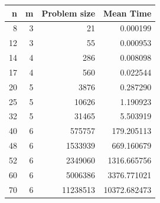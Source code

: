 \begin{tabular}{rrrr}
\toprule
n & m & Problem size & Mean Time \\
\midrule
8 & 3 & 21 & 0.000199 \\
12 & 3 & 55 & 0.000953 \\
14 & 4 & 286 & 0.008098 \\
17 & 4 & 560 & 0.022544 \\
20 & 5 & 3876 & 0.287290 \\
25 & 5 & 10626 & 1.190923 \\
32 & 5 & 31465 & 5.503919 \\
40 & 6 & 575757 & 179.205113 \\
48 & 6 & 1533939 & 669.160679 \\
52 & 6 & 2349060 & 1316.665756 \\
60 & 6 & 5006386 & 3376.771021 \\
70 & 6 & 11238513 & 10372.682473 \\
\bottomrule
\end{tabular}

